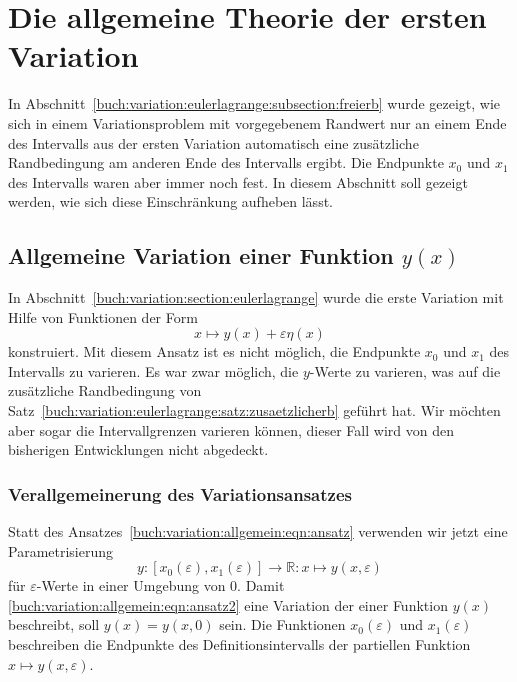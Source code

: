 %
%
%
\section{Die allgemeine Theorie der ersten Variation
\label{buch:variation:section:allgemein}}
In Abschnitt~\ref{buch:variation:eulerlagrange:subsection:freierb}
wurde gezeigt, wie sich in einem Variationsproblem mit vorgegebenem
Randwert nur an einem Ende des Intervalls aus der ersten Variation
automatisch eine zusätzliche Randbedingung am anderen Ende des
Intervalls ergibt.
Die Endpunkte $x_0$ und $x_1$ des Intervalls waren aber immer noch 
fest.
In diesem Abschnitt soll gezeigt werden, wie sich diese Einschränkung
aufheben lässt.

%
%
\subsection{Allgemeine Variation einer Funktion $y(x)$
\label{buch:variation:allgemein:subsection:vary}}
%
In Abschnitt~\ref{buch:variation:section:eulerlagrange} wurde die
erste Variation mit Hilfe von Funktionen der Form
\begin{equation}
x
\mapsto
y(x)+\varepsilon\eta(x)
\label{buch:variation:allgemein:eqn:ansatz}
\end{equation}
konstruiert.
Mit diesem Ansatz ist es nicht möglich, die Endpunkte $x_0$ und $x_1$
des Intervalls zu varieren.
Es war zwar möglich, die $y$-Werte zu varieren, was auf die zusätzliche
Randbedingung von
Satz~\ref{buch:variation:eulerlagrange:satz:zusaetzlicherb}
geführt hat.
Wir möchten aber sogar die Intervallgrenzen varieren können, dieser
Fall wird von den bisherigen Entwicklungen nicht abgedeckt.

%
%
\subsubsection{Verallgemeinerung des Variationsansatzes}
Statt des Ansatzes~\eqref{buch:variation:allgemein:eqn:ansatz}
verwenden wir jetzt eine Parametrisierung
\begin{equation}
y
\colon
[x_0(\varepsilon),x_1(\varepsilon)]
\to
\mathbb{R}
:
x\mapsto y(x,\varepsilon)
\label{buch:variation:allgemein:eqn:ansatz2}
\end{equation}
für $\varepsilon$-Werte in einer Umgebung von $0$.
Damit
\eqref{buch:variation:allgemein:eqn:ansatz2}
eine Variation der einer Funktion $y(x)$ beschreibt, soll
$y(x) = y(x,0)$ sein.
Die Funktionen $x_0(\varepsilon)$ und $x_1(\varepsilon)$ beschreiben
die Endpunkte des Definitionsintervalls der partiellen Funktion
$x\mapsto y(x,\varepsilon)$.

